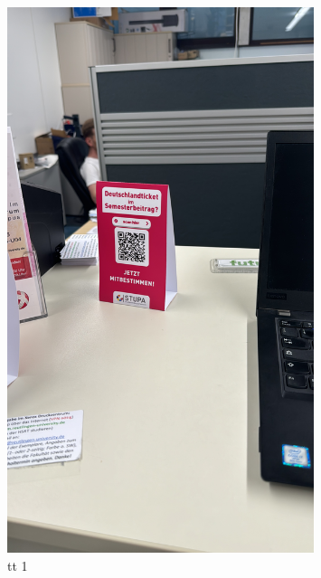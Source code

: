 \begin{multicols}{3}
    \begin{figure}[H]
        \vspace{0.3\textwidth}
        \includegraphics[width=0.8\textwidth, angle =-90]{Content/Images/tabletent.JPG}
        \caption{\gls{tt} 1}
        \label{fig:table-tent1}
    \end{figure}
    \columnbreak
    \begin{figure}[H]
        \vspace{0.3\textwidth}

\end{figure}
\end{multicols}

